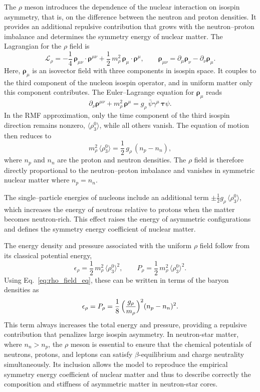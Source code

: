 The $\rho$ meson introduces the dependence of the nuclear interaction on
isospin asymmetry, that is, on the difference between the neutron and proton
densities. It provides an additional repulsive contribution that grows with the
neutron–proton imbalance and determines the symmetry energy of nuclear matter.
The Lagrangian for the $\rho$ field is
\[
\mathcal{L}_{\rho}
= -\frac{1}{4}\,\boldsymbol{\rho}_{\mu\nu}\!\cdot\!\boldsymbol{\rho}^{\mu\nu}
  + \frac{1}{2}\,m_{\rho}^{2}\,
    \boldsymbol{\rho}_{\mu}\!\cdot\!\boldsymbol{\rho}^{\mu},
\qquad
\boldsymbol{\rho}_{\mu\nu}
  = \partial_{\mu}\boldsymbol{\rho}_{\nu} - \partial_{\nu}\boldsymbol{\rho}_{\mu}.
\]
Here, $\boldsymbol{\rho}_{\mu}$ is an isovector field with three components in
isospin space. It couples to the third component of the nucleon isospin
operator, and in uniform matter only this component contributes. The Euler–Lagrange equation for $\boldsymbol{\rho}_{\mu}$ reads
\[
\partial_{\nu}\boldsymbol{\rho}^{\mu\nu}
+ m_{\rho}^{2}\,\boldsymbol{\rho}^{\mu}
= g_{\rho}\,\bar{\psi}\gamma^{\mu}\,\boldsymbol{\tau}\psi.
\]
In the RMF approximation, only the time component of the third isospin direction
remains nonzero, $\langle\rho^0_3\rangle$, while all others
vanish. The equation of motion then reduces to
\begin{equation}
m_{\rho}^{2}\,\langle\rho^0_3\rangle
= \frac{1}{2}\,g_{\rho}\,(n_{p}-n_{n}),
\label{eq:rho_field_eq}
\end{equation}
where $n_{p}$ and $n_{n}$ are the proton and neutron densities. The $\rho$
field is therefore directly proportional to the neutron–proton imbalance and
vanishes in symmetric nuclear matter where $n_{p}=n_{n}$.

The single–particle energies of nucleons include an additional term
$\pm \tfrac{1}{2} g_{\rho}\,\langle\rho^0_3\rangle$, which increases the energy of
neutrons relative to protons when the matter becomes neutron-rich. This effect
raises the energy of asymmetric configurations and defines the symmetry energy
coefficient of nuclear matter.

The energy density and pressure associated with the uniform $\rho$ field follow
from its classical potential energy,
\begin{equation}
\epsilon_{\rho} = \frac{1}{2}\,m_{\rho}^{2}\,\langle\rho^0_3\rangle^{2},
\qquad
P_{\rho} = \frac{1}{2}\,m_{\rho}^{2}\,\langle\rho^0_3\rangle^{2}.
\label{eq:rho_eps_P}
\end{equation}
Using Eq.~\eqref{eq:rho_field_eq}, these can be written in terms of the baryon
densities as
\[
\epsilon_{\rho} = P_{\rho}
= \frac{1}{8}\,
  \Bigl(\frac{g_{\rho}}{m_{\rho}}\Bigr)^{2}
  (n_{p}-n_{n})^{2}.
\]
This term always increases the total energy and pressure, providing a repulsive
contribution that penalizes large isospin asymmetry. In neutron-star matter,
where $n_{n}>n_{p}$, the $\rho$ meson is essential to ensure that the chemical
potentials of neutrons, protons, and leptons can satisfy
$\beta$-equilibrium and charge neutrality simultaneously. Its inclusion allows
the model to reproduce the empirical symmetry energy coefficient of nuclear
matter and thus to describe correctly the composition and stiffness of
asymmetric matter in neutron-star cores.


